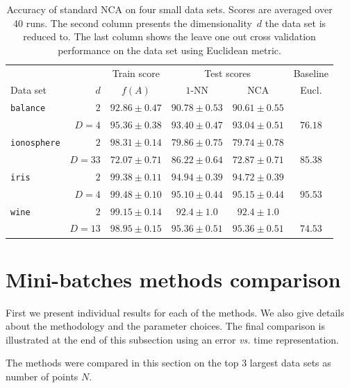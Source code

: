 \begin{table}
  \centering\begin{tabular}{lrcccc}
  \toprule
	  &     & Train score  & \multicolumn{2}{c}{Test scores} & Baseline \\
  \cmidrule(r){3-3} \cmidrule(r){4-5} \cmidrule(r){6-6}
  Data set & $d$ & $f(A)$ & $1$-NN & NCA & Eucl. \\
  \midrule
    \texttt{balance}&$2$&$92.86 \pm 0.47$&$90.78 \pm 0.53$&$90.61 \pm 0.55$&\\ 
		    &$D=4$&$95.36 \pm 0.38$&$93.40 \pm 0.47$&$93.04 \pm 0.51$&$76.18$\\ 
    \midrule
    \texttt{ionosphere}&$2$&$98.31 \pm 0.14$&$79.86 \pm 0.75$&$79.74 \pm 0.78$&\\ 
		       &$D=33$&$72.07 \pm 0.71$&$86.22 \pm 0.64$&$72.87 \pm 0.71$&$85.38$\\ 
    \midrule
    \texttt{iris}&$2$&$99.38 \pm 0.11$&$94.94 \pm 0.39$&$94.72 \pm 0.39$&\\ 
		 &$D=4$&$99.48 \pm 0.10$&$95.10 \pm 0.44$&$95.15 \pm 0.44$&$95.53$\\
    \midrule
    \texttt{wine}&$2$&$99.15 \pm 0.14$&$92.4 \pm 1.0$&$92.4 \pm 1.0$&\\ 
		 &$D=13$&$98.95 \pm 0.15$&$95.36 \pm 0.51$&$95.36 \pm 0.51$&$74.53$\\ 
  \bottomrule
  \end{tabular}
  \caption{\small Accuracy of standard NCA on four small data sets. Scores are averaged over 40 runs. The second column presents the dimensionality~$d$ the data set is reduced to. The last column shows the leave one out cross validation performance on the data set using Euclidean metric.}
  \label{table:eval-baseline}
\end{table}

\section{Mini-batches methods comparison}
\label{sec:method-comparison}

First we present individual results for each of the methods. We also give details about the methodology and the parameter choices. The final comparison is illustrated at the end of this subsection using an error \textit{vs.} time representation.

The methods were compared in this section on the top 3 largest data sets as number of points $N$.


